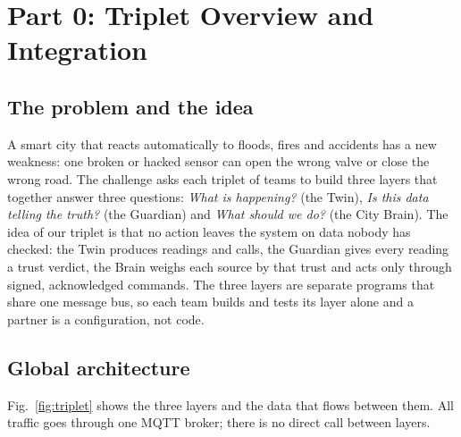 \section{Part 0: Triplet Overview and Integration}
\subsection{The problem and the idea}
A smart city that reacts automatically to floods, fires and accidents has a new weakness: one broken or hacked
sensor can open the wrong valve or close the wrong road. The challenge asks each triplet of teams to build three
layers that together answer three questions: \emph{What is happening?} (the Twin), \emph{Is this data telling the truth?}
(the Guardian) and \emph{What should we do?} (the City Brain). The idea of our triplet is that no action leaves the
system on data nobody has checked: the Twin produces readings and calls, the Guardian gives every reading a trust
verdict, the Brain weighs each source by that trust and acts only through signed, acknowledged commands. The three layers
are separate programs that share one message bus, so each team builds and tests its layer alone and a partner is a
configuration, not code.

\subsection{Global architecture}
Fig.~\ref{fig:triplet} shows the three layers and the data that flows between them. All traffic goes through one
MQTT broker; there is no direct call between layers.

